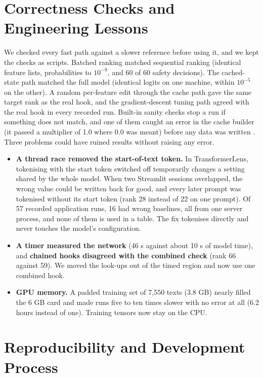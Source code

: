 \section{Correctness Checks and Engineering Lessons}

We checked every fast path against a slower reference before using it, and we kept the checks as scripts. Batched ranking matched sequential ranking (identical feature lists, probabilities to $10^{-9}$, and 60 of 60 safety decisions). The cached-state path matched the full model (identical logits on one machine, within $10^{-5}$ on the other). A random per-feature edit through the cache path gave the same target rank as the real hook, and the gradient-descent tuning path agreed with the real hook in every recorded run. Built-in sanity checks stop a run if something does not match, and one of them caught an error in the cache builder (it passed a multiplier of 1.0 where 0.0 was meant) before any data was written \cite{p5,p13}. Three problems could have ruined results without raising any error.
\begin{itemize}
  \item \textbf{A thread race removed the start-of-text token.} In TransformerLens, tokenising with the start token switched off temporarily changes a setting shared by the whole model. When two Streamlit sessions overlapped, the wrong value could be written back for good, and every later prompt was tokenised without its start token (rank 28 instead of 22 on one prompt). Of 57 recorded application runs, 16 had wrong baselines, all from one server process, and none of them is used in a table. The fix tokenises directly and never touches the model's configuration.
  \item \textbf{A timer measured the network} (46 s against about 10 s of model time), and \textbf{chained hooks disagreed with the combined check} (rank 66 against 59). We moved the look-ups out of the timed region and now use one combined hook.
  \item \textbf{GPU memory.} A padded training set of 7,550 texts (3.8 GB) nearly filled the 6 GB card and made runs five to ten times slower with no error at all (6.2 hours instead of one). Training tensors now stay on the CPU.
\end{itemize}

\section{Reproducibility and Development Process}

